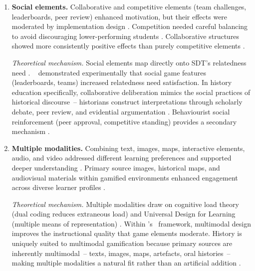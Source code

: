 \begin{enumerate}
\item \textbf{Social elements.} Collaborative and competitive elements (team challenges, leaderboards, peer review) enhanced motivation, but their effects were moderated by implementation design \cite{3Watson2011466, 49Huizenga2007127, Sailer2017}. Competition needed careful balancing to avoid discouraging lower-performing students \cite{11Ternblad2023115, 47Clara2010156}. Collaborative structures showed more consistently positive effects than purely competitive elements \cite{46Stirling2022, 39Tegos2014838}.

\textit{Theoretical mechanism.} Social elements map directly onto SDT's relatedness need \cite{RyanDeci2000, vanRoyZaman2019}. \citeauthor{Sailer2017}~\cite{Sailer2017} demonstrated experimentally that social game features (leaderboards, teams) increased relatedness need satisfaction. In history education specifically, collaborative deliberation mimics the social practices of historical discourse~-- historians construct interpretations through scholarly debate, peer review, and evidential argumentation \cite{Wineburg2001}. Behaviourist social reinforcement (peer approval, competitive standing) provides a secondary mechanism \cite{BaiHewHuang2020}.

\item \textbf{Multiple modalities.} Combining text, images, maps, interactive elements, audio, and video addressed different learning preferences and supported deeper understanding \cite{10Huaman2019220, 62Milosz201896, 27Sumi2022}. Primary source images, historical maps, and audiovisual materials within gamified environments enhanced engagement across diverse learner profiles \cite{59Kee2014270, 74Fendt2019}.

\textit{Theoretical mechanism.} Multiple modalities draw on cognitive load theory (dual coding reduces extraneous load) and Universal Design for Learning (multiple means of representation) \cite{Keller2010, LaineLindberg2020}. Within \citeauthor{Landers2014}'s~\cite{Landers2014} framework, multimodal design improves the instructional quality that game elements moderate. History is uniquely suited to multimodal gamification because primary sources are inherently multimodal~-- texts, images, maps, artefacts, oral histories~-- making multiple modalities a natural fit rather than an artificial addition \cite{Reisman2012, Hunicke2004}.
\end{enumerate}



